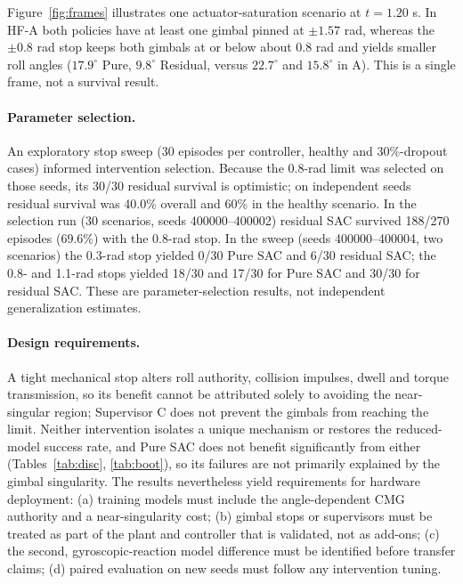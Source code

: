 \documentclass[preprint,12pt,authoryear=false]{elsarticle}
\theoremstyle{remark}\newtheorem{remark}{Remark}
\theoremstyle{plain}\newtheorem{proposition}{Proposition}\newtheorem{lemma}{Lemma}
\theoremstyle{definition}\newtheorem{assumption}{Assumption}
\begin{document}
Figure~\ref{fig:frames} illustrates one actuator-saturation scenario at $t=1.20$ s. In HF-A both policies have at least one gimbal pinned at $\pm1.57$ rad, whereas the $\pm0.8$ rad stop keeps both gimbals at or below about 0.8 rad and yields smaller roll angles ($17.9^\circ$ Pure, $9.8^\circ$ Residual, versus $22.7^\circ$ and $15.8^\circ$ in A). This is a single frame, not a survival result.

\paragraph{Parameter selection.} An exploratory stop sweep (30 episodes per controller, healthy and 30\%-dropout cases) informed intervention selection. Because the 0.8-rad limit was selected on those seeds, its 30/30 residual survival is optimistic; on independent seeds residual survival was 40.0\% overall and 60\% in the healthy scenario. In the selection run (30 scenarios, seeds 400000--400002) residual SAC survived 188/270 episodes (69.6\%) with the 0.8-rad stop. In the sweep (seeds 400000--400004, two scenarios) the 0.3-rad stop yielded 0/30 Pure SAC and 6/30 residual SAC; the 0.8- and 1.1-rad stops yielded 18/30 and 17/30 for Pure SAC and 30/30 for residual SAC. These are parameter-selection results, not independent generalization estimates.

\paragraph{Design requirements.} A tight mechanical stop alters roll authority, collision impulses, dwell and torque transmission, so its benefit cannot be attributed solely to avoiding the near-singular region; Supervisor C does not prevent the gimbals from reaching the limit. Neither intervention isolates a unique mechanism or restores the reduced-model success rate, and Pure SAC does not benefit significantly from either (Tables~\ref{tab:disc}, \ref{tab:boot}), so its failures are not primarily explained by the gimbal singularity. The results nevertheless yield requirements for hardware deployment: (a) training models must include the angle-dependent CMG authority and a near-singularity cost; (b) gimbal stops or supervisors must be treated as part of the plant and controller that is validated, not as add-ons; (c) the second, gyroscopic-reaction model difference must be identified before transfer claims; (d) paired evaluation on new seeds must follow any intervention tuning.

\end{document}
